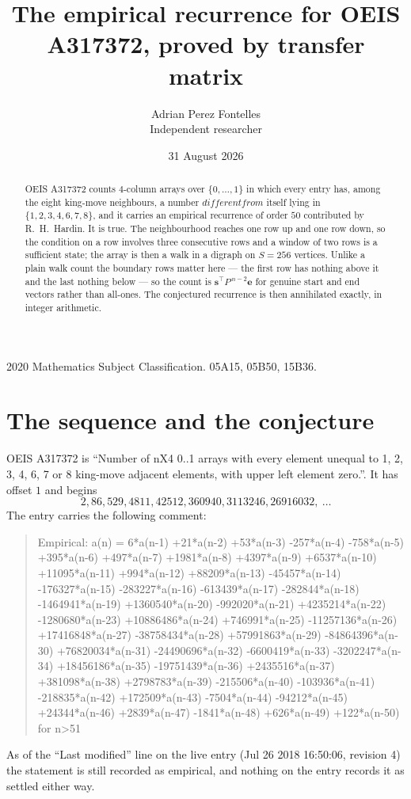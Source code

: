 \documentclass[11pt,a4paper]{article}
\title{The empirical recurrence for OEIS A317372, proved by transfer matrix}
\author{Adrian Perez Fontelles\\ \small Independent researcher}
\date{31 August 2026}
\theoremstyle{plain}
\theoremstyle{definition}
\begin{document}
\maketitle

\begin{abstract}
OEIS A317372 counts $4$-column arrays over $\{0,\dots,1\}$ in which every entry has,
among the eight king-move neighbours, a number $different from$ itself lying in $\{1,2,3,4,6,7,8\}$, and it carries an empirical
recurrence of order $50$ contributed by R.~H.~Hardin. It is true. The neighbourhood
reaches one row up and one row down, so the condition on a row involves three consecutive
rows and a window of two rows is a sufficient state; the array is then a walk in a digraph
on $S=256$ vertices. Unlike a plain walk count the boundary rows matter here --- the first
row has nothing above it and the last nothing below --- so the count is
$\mathbf{s}^{\!\top}P^{\,n-2}\mathbf{e}$ for genuine start and end vectors rather than
all-ones. The conjectured recurrence is then annihilated exactly, in integer arithmetic.
\end{abstract}

\noindent\small 2020 Mathematics Subject Classification. 05A15, 05B50, 15B36.\normalsize

\section{The sequence and the conjecture}

OEIS A317372 is ``Number of nX4 0..1 arrays with every element unequal to 1, 2, 3, 4, 6, 7 or 8 king-move adjacent elements, with upper left element zero.''. It has offset
$1$ and begins
\[
2, 86, 529, 4811, 42512, 360940, 3113246, 26916032,\ \dots
\]
The entry carries the following comment:
\begin{quote}\small
Empirical: a(n) = 6*a(n-1) +21*a(n-2) +53*a(n-3) -257*a(n-4) -758*a(n-5) +395*a(n-6) +497*a(n-7) +1981*a(n-8) +4397*a(n-9) +6537*a(n-10) +11095*a(n-11) +994*a(n-12) +88209*a(n-13) -45457*a(n-14) -176327*a(n-15) -283227*a(n-16) -613439*a(n-17) -282844*a(n-18) -1464941*a(n-19) +1360540*a(n-20) -992020*a(n-21) +4235214*a(n-22) -1280680*a(n-23) +10886486*a(n-24) +746991*a(n-25) -11257136*a(n-26) +17416848*a(n-27) -38758434*a(n-28) +57991863*a(n-29) -84864396*a(n-30) +76820034*a(n-31) -24490696*a(n-32) -6600419*a(n-33) -3202247*a(n-34) +18456186*a(n-35) -19751439*a(n-36) +2435516*a(n-37) +381098*a(n-38) +2798783*a(n-39) -215506*a(n-40) -103936*a(n-41) -218835*a(n-42) +172509*a(n-43) -7504*a(n-44) -94212*a(n-45) +24344*a(n-46) +2839*a(n-47) -1841*a(n-48) +626*a(n-49) +122*a(n-50) for n>51
\end{quote}
As of the ``Last modified'' line on the live entry (Jul 26 2018 16:50:06, revision
4) the statement is still recorded as empirical, and nothing on the entry
records it as settled either way.
\end{document}
